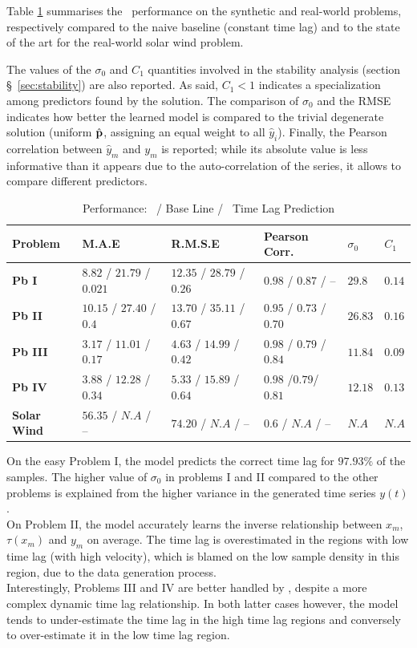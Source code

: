 Table \ref{tab:results_syn} summarises the \XX\ performance on the synthetic and real-world 
problems, respectively compared to the naive baseline (constant time lag) and to the state of the 
art for the real-world solar wind problem. 

The values of the $\sigma_0$ and $C_1$ quantities involved in the stability analysis 
(section \S~\ref{sec:stability}) are also reported. As said, $C_1 < 1$ indicates a specialization 
among predictors found by the solution. The comparison of $\sigma_0$ and the RMSE indicates how 
better the learned model is compared to the trivial degenerate solution (uniform $\hat {\bf p}$, 
assigning an equal weight to all $\hat y_i$). Finally, the Pearson correlation between 
$\hat y_m$ and $y_m$ is reported; while its absolute value is less informative than it appears due 
to the auto-correlation of the series, it allows to compare different predictors. 

\begin{table}
  \caption{Performance: \XX  \ / Base Line / \XX  \ Time Lag Prediction}\label{tab:results_syn}
  \centering
  \begin{tabular}{ l l l l l l}
  \hline
  Problem &  M.A.E & R.M.S.E & Pearson Corr. & $\sigma_0$ & $C_1$\\
  \hline
  \textbf{Pb I} & $8.82$ / $21.79$ / $0.021$  & $12.35$ / $28.79$ / $0.26$ & $0.98$ / $0.87$ / -- & $29.8$ & $0.14$\\
  \textbf{Pb II} & $10.15$ / $27.40$ / $0.4$ & $13.70$ / $35.11$ / $0.67$ & $0.95$ / $0.73$ / $0.70$ & $26.83$ & $0.16$\\
  \textbf{Pb III} & $3.17$ / $11.01$ / $0.17$ & $4.63$ / $14.99$ / $0.42$ & $0.98$ / $0.79$ / $0.84$ & $11.84$ & $0.09$\\
  \textbf{Pb IV} & $3.88$ / $12.28$ / $0.34$ & $5.33$ / $15.89$ / $0.64$ & $0.98$ /$0.79$/ $0.81$ & $12.18$ & $0.13$\\
  \textbf{Solar Wind} & $56.35$ / $N.A$ / -- & $74.20$ / $N.A$ / -- & $0.6$ / $N.A$ / -- & $N.A$ & $N.A$\\
  \hline
  \end{tabular}
\end{table}

On the easy Problem I, the model predicts the correct time lag for $97.93\%$ of the samples. The 
higher value of $\sigma_0$ in problems I and II compared to the other problems is explained from 
the higher variance in the generated  time series $y(t)$. \\
On Problem II, the model accurately learns the inverse relationship between $x_m$, $\tau(x_m)$ and 
$y_m$ on average. The time lag is overestimated in the regions with low time lag 
(with high velocity), which is blamed on the low sample density in this region, due to the data 
generation process. \\
Interestingly, Problems III and IV are better handled by \XX, despite a more complex dynamic time 
lag relationship. In both latter cases however, the model tends to under-estimate the time lag in 
the high time lag regions and conversely to over-estimate it in the low time lag region. 

